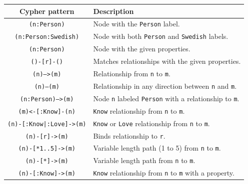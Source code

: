 \begin{table}[H]
    \centering
    \begin{tabular}{|c|l|}
    \hline
    \textbf{Cypher pattern}                                & \textbf{Description}                                           \\ \hline
    \texttt{(n:Person)}                                   & Node with the \texttt{Person} label.                                   \\ \hline
    \texttt{(n:Person:Swedish)}                          & Node with both \texttt{Person} and \texttt{Swedish} labels.                     \\ \hline
    \texttt{(n:Person\string{name:\$value\string})}                & Node with the given properties.                             \\ \hline
    \texttt{()-[r\string{name:\$value\string}]-()}                 & Matches relationships with the given properties.            \\ \hline
    \texttt{(n)-->(m)}                                   & Relationship from \texttt{n} to \texttt{m}.                                     \\ \hline
    \texttt{(n)--(m)}                                    & Relationship in any direction between \texttt{n} and \texttt{m}.                \\ \hline
    \texttt{(n:Person)-->(m)}                            & Node \texttt{n} labeled \texttt{Person} with a relationship to \texttt{m}.              \\ \hline
    \texttt{(m)<-[:Know]-(n)}                           & \texttt{Know} relationship from \texttt{n} to \texttt{m}.                               \\ \hline
    \texttt{(n)-[:Know|:Love]->(m)}                    & \texttt{Know} or \texttt{Love} relationship from \texttt{n} to \texttt{m}.                      \\ \hline
    \texttt{(n)-[r]->(m)}                                & Binds relationship to \texttt{r}.                                      \\ \hline
    \texttt{(n)-[*1..5]->(m)}                            & Variable length path (1 to 5) from \texttt{n} to \texttt{m}.                   \\ \hline
    \texttt{(n)-[*]->(m)}                                & Variable length path from \texttt{n} to \texttt{m}.                             \\ \hline
    \texttt{(n)-[:Know]->(m\string{property:\$value\string})}    & \texttt{Know} relationship from \texttt{n} to \texttt{m} with a property.               \\ \hline
    \end{tabular}
\end{table}


